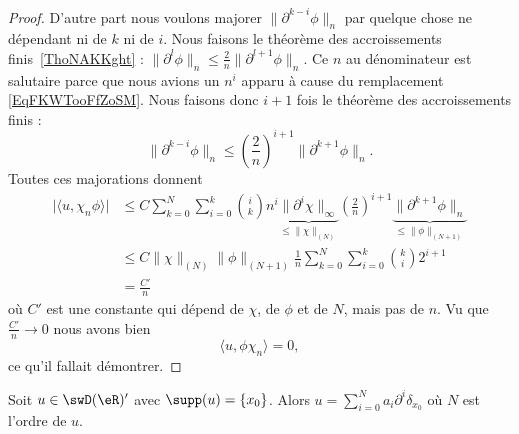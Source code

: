 \begin{proof}
        D'autre part nous voulons majorer \( \| \partial^{k-i}\phi \|_n\) par quelque chose ne dépendant ni de \( k\) ni de \( i\). Nous faisons le théorème des accroissements finis~\ref{ThoNAKKght} : \( \| \partial^l\phi \|_n\leq \frac{ 2 }{ n }\| \partial^{l+1}\phi \|_n\). Ce \( n\) au dénominateur est salutaire parce que nous avions un \( n^i\) apparu à cause du remplacement \eqref{EqFKWTooFfZoSM}. Nous faisons donc \( i+1\) fois le théorème des accroissements finis :
        \begin{equation}
            \| \partial^{k-i} \phi\|_n\leq \left( \frac{ 2 }{ n } \right)^{i+1}\| \partial^{k+1}\phi \|_n.
        \end{equation}
        Toutes ces majorations donnent
        \begin{subequations}
            \begin{align}
            \big| \langle u, \chi_n\phi\rangle  \big|&\leq C\sum_{k=0}^N\sum_{i=0}^k\binom{ i }{ k }n^i\underbrace{\| \partial^i\chi \|_{\infty}}_{\leq \| \chi \|_{(N)}}\left( \frac{ 2 }{ n } \right)^{i+1}  \underbrace{\|  \partial^{k+1}\phi \|_n}_{\leq \| \phi \|_{(N+1)}}\\
            &\leq C\| \chi \|_{(N)}\| \phi \|_{(N+1)}\frac{1}{ n }\sum_{k=0}^N\sum_{i=0}^k\binom{ k }{ i }2^{i+1}\\
            &=\frac{ C' }{ n }
            \end{align}
        \end{subequations}
        où \( C'\) est une constante qui dépend de \( \chi\), de \( \phi\) et de \( N\), mais pas de \( n\). Vu que \( \frac{ C' }{ n }\to 0\) nous avons bien
        \begin{equation}
            \langle u, \phi\chi_n\rangle=0,
        \end{equation}
        ce qu'il fallait démontrer.
\end{proof}


\begin{proposition}     \label{PropXXPLooSkgxOz}
    Soit \( u\in\swD(\eR)'\) avec \( \supp(u)=\{ x_0 \}\). Alors \( u=\sum_{i=0}^{N}a_i\partial^i\delta_{x_0}\) où \( N\) est l'ordre de \( u\).
\end{proposition}

